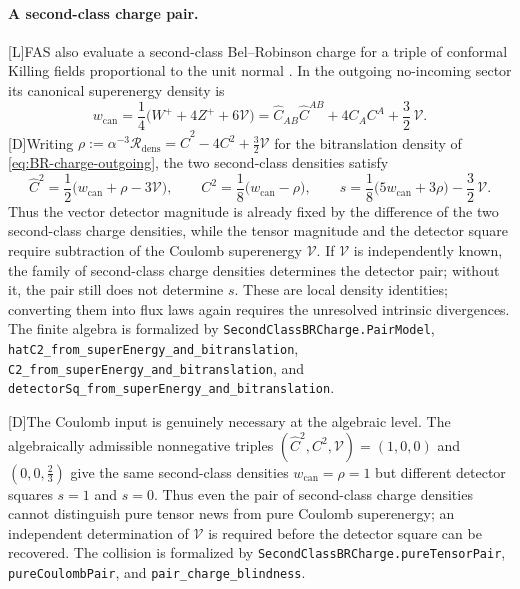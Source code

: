\documentclass[11pt,a4paper]{article}
\newcommand{\cR}{\mathcal{R}}
\newcommand{\cV}{\mathcal{V}}
\newcommand{\statusL}{\textsf{[L]}}
\newcommand{\statusD}{\textsf{[D]}}
\begin{document}
\paragraph{A second-class charge pair.}
\statusL FAS also evaluate a second-class Bel--Robinson charge for a triple of conformal Killing fields proportional to the unit normal \cite{fabSen2022asymptotic}.  In the outgoing no-incoming sector its canonical superenergy density is
\begin{equation}\label{eq:BR-canonical-superenergy-outgoing}
  w_{\mathrm{can}}
  =
  \frac14\big(W^+ + 4Z^+ + 6\cV\big)
  =
  \hat C_{AB}\hat C^{AB}
  +
  4 C_AC^A
  +
  \frac32\,\cV .
\end{equation}
\statusD Writing \(\rho:=\alpha^{-3}\cR_{\mathrm{dens}}=\hat C^2-4C^2+\tfrac32\cV\) for the bitranslation density of \eqref{eq:BR-charge-outgoing}, the two second-class densities satisfy
\begin{equation}\label{eq:BR-pair-inversion}
  \hat C^2
  =
  \frac12\big(w_{\mathrm{can}}+\rho-3\cV\big),
  \qquad
  C^2
  =
  \frac18\big(w_{\mathrm{can}}-\rho\big),
  \qquad
  s
  =
  \frac18\big(5w_{\mathrm{can}}+3\rho\big)-\frac32\,\cV .
\end{equation}
Thus the vector detector magnitude is already fixed by the difference of the two second-class charge densities, while the tensor magnitude and the detector square require subtraction of the Coulomb superenergy \(\cV\).  If \(\cV\) is independently known, the family of second-class charge densities determines the detector pair; without it, the pair still does not determine \(s\).  These are local density identities; converting them into flux laws again requires the unresolved intrinsic divergences.  The finite algebra is formalized by \texttt{SecondClassBRCharge.PairModel}, \texttt{hatC2\_from\_superEnergy\_and\_bitranslation}, \texttt{C2\_from\_superEnergy\_and\_bitranslation}, and \texttt{detectorSq\_from\_superEnergy\_and\_bitranslation}.

\statusD The Coulomb input is genuinely necessary at the algebraic level.  The algebraically admissible nonnegative triples \((\hat C^2,C^2,\cV)=(1,0,0)\) and \((0,0,\tfrac23)\) give the same second-class densities \(w_{\mathrm{can}}=\rho=1\) but different detector squares \(s=1\) and \(s=0\).  Thus even the pair of second-class charge densities cannot distinguish pure tensor news from pure Coulomb superenergy; an independent determination of \(\cV\) is required before the detector square can be recovered.  The collision is formalized by \texttt{SecondClassBRCharge.pureTensorPair}, \texttt{pureCoulombPair}, and \texttt{pair\_charge\_blindness}.
\end{document}
